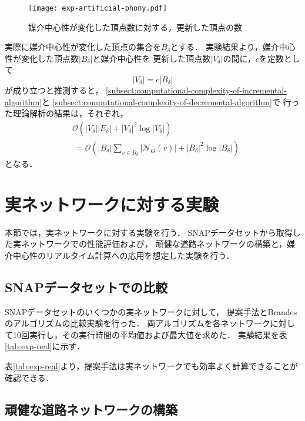\begin{figure}[tb]
  \centering
  \texttt{[image: exp-artificial-phony.pdf]}
  \caption{媒介中心性が変化した頂点数に対する，更新した頂点の数}
  \label{fig:exp-artificial-phony}
\end{figure}

実際に媒介中心性が変化した頂点の集合を$B_\delta$とする．
実験結果より，媒介中心性が変化した頂点数$\lvert B_\delta\rvert$と媒介中心性を
更新した頂点数$\lvert V_\delta\rvert$の間に，$c$を定数として
\[ \lvert V_\delta\rvert=c\lvert B_\delta\rvert \]
が成り立つと推測すると，
\ref{subsect:computational-complexity-of-incremental-algorithm}と
\ref{subsect:computational-complexity-of-decremental-algorithm}で
行った理論解析の結果は，それぞれ，
\begin{equation*}
  \begin{aligned}
    &\mathcal{O}(\lvert V_\delta\rvert\lvert E_\delta\rvert+\lvert V_\delta\rvert^2\log\lvert V_\delta\rvert) \\
    &\:=\mathcal{O}(\lvert B_\delta\rvert\sum_{v\in B_\delta}\lvert\mathcal{N}_G(v)\rvert+\lvert B_\delta\rvert^2\log\lvert B_\delta\rvert)
  \end{aligned}
\end{equation*}
となる．

\section{実ネットワークに対する実験}
\label{sect:exp-realnet}

本節では，実ネットワークに対する実験を行う．
SNAPデータセット\cite{Leskovec2016}から取得した実ネットワークでの性能評価および，
頑健な道路ネットワークの構築と，媒介中心性のリアルタイム計算への応用を想定した実験を行う．

\subsection{SNAPデータセットでの比較}
\label{subsect:exp-real}

SNAPデータセットのいくつかの実ネットワークに対して，
提案手法とBrandesのアルゴリズムの比較実験を行った．
両アルゴリズムを各ネットワークに対して10回実行し，その実行時間の平均値および最大値を求めた．
実験結果を表\ref{tab:exp-real}に示す．



表\ref{tab:exp-real}より，提案手法は実ネットワークでも効率よく計算できることが確認できる．

\subsection{頑健な道路ネットワークの構築}
\label{subsect:exp-road}

